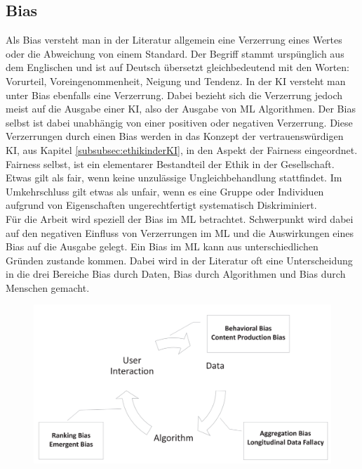 \begin{onehalfspace}
    \subsection{Bias}
    \label{subsubsec:Bias}
        Als Bias versteht man in der Literatur allgemein eine Verzerrung eines Wertes oder die Abweichung von einem Standard.\cite{Fabi2022} Der Begriff stammt urspünglich aus dem Englischen und ist auf Deutsch übersetzt gleichbedeutend mit den Worten: Vorurteil, Voreingenommenheit, Neigung und Tendenz. In der \ac*{KI} versteht man unter Bias ebenfalls eine Verzerrung. Dabei bezieht sich die Verzerrung jedoch meist auf die Ausgabe einer \ac*{KI}, also der Ausgabe von \ac*{ML} Algorithmen.\cite{Dilmegani2020} Der Bias selbst ist dabei unabhängig von einer positiven oder negativen Verzerrung.\cite{silberg2019notes}\cite{ntoutsi2020bias}
        Diese Verzerrungen durch einen Bias werden in das Konzept der vertrauenswürdigen \ac*{KI}, aus Kapitel \ref{subsubsec:ethikinderKI}, in den Aspekt der Fairness eingeordnet. Fairness selbst, ist ein elementarer Bestandteil der Ethik in der Gesellschaft. Etwas gilt als \glqq{}fair\grqq{}, wenn keine unzulässige Ungleichbehandlung stattfindet. Im Umkehrschluss gilt etwas als \glqq{}unfair\grqq{}, wenn es eine Gruppe oder Individuen aufgrund von Eigenschaften ungerechtfertigt systematisch Diskriminiert.\cite{silberg2019notes}
        \\
        Für die Arbeit wird speziell der Bias im \ac*{ML} betrachtet. Schwerpunkt wird dabei auf den negativen Einfluss von Verzerrungen im \ac*{ML} und die Auswirkungen eines Bias auf die Ausgabe gelegt. Ein Bias im \ac*{ML} kann aus unterschiedlichen Gründen zustande kommen. Dabei wird in der Literatur oft eine Unterscheidung in die drei Bereiche Bias durch Daten, Bias durch Algorithmen und Bias durch Menschen gemacht.\cite{srinivasan2021biases}\cite{Mehrabi2021}
        \begin{figure}[h]
            \centering
            \includegraphics[width =15cm]{Bilder/Bias_cyrcle.png}

\end{figure}
\end{onehalfspace}
